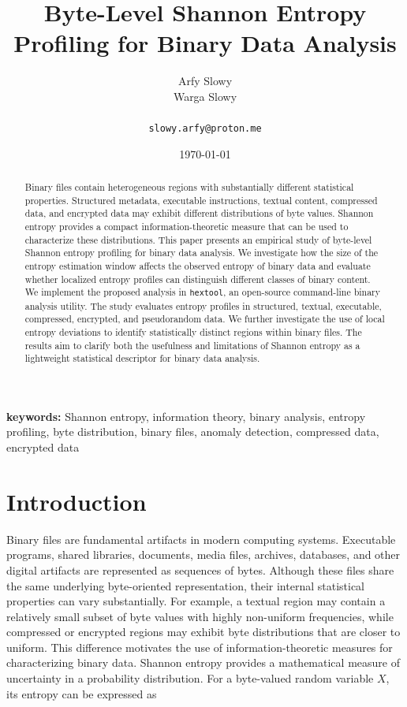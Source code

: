 \documentclass[10pt,letterpaper]{article}
\title{Byte-Level Shannon Entropy Profiling for Binary Data Analysis}
\author{
    Arfy Slowy\\
    Warga Slowy\\
    \\
    \texttt{slowy.arfy@proton.me}
}
\date{\today}
\begin{document}
\maketitle

\begin{abstract} Binary files contain heterogeneous regions with substantially different statistical properties. Structured metadata, executable instructions, textual content, compressed data, and encrypted data may exhibit different distributions of byte values. Shannon entropy provides a compact information-theoretic measure that can be used to characterize these distributions. This paper presents an empirical study of byte-level Shannon entropy profiling for binary data analysis. We investigate how the size of the entropy estimation window affects the observed entropy of binary data and evaluate whether localized entropy profiles can distinguish different classes of binary content. We implement the proposed analysis in \texttt{hextool}, an open-source command-line binary analysis utility. The study evaluates entropy profiles in structured, textual, executable, compressed, encrypted, and pseudorandom data. We further investigate the use of local entropy deviations to identify statistically distinct regions within binary files. The results aim to clarify both the usefulness and limitations of Shannon entropy as a lightweight statistical descriptor for binary data analysis. \end{abstract}


\noindent
\textbf{keywords:}
Shannon entropy, information theory, binary analysis, entropy profiling, byte distribution, binary files, anomaly detection, compressed data, encrypted data


\section{Introduction}

Binary files are fundamental artifacts in modern computing systems. Executable programs, shared libraries, documents, media files, archives, databases, and other digital artifacts are represented as sequences of bytes. Although these files share the same underlying byte-oriented representation, their internal statistical properties can vary substantially. For example, a textual region may contain a relatively small subset of byte values with highly non-uniform frequencies, while compressed or encrypted regions may exhibit byte distributions that are closer to uniform. This difference motivates the use of information-theoretic measures for characterizing binary data. Shannon entropy provides a mathematical measure of uncertainty in a probability distribution. For a byte-valued random variable $X$, its entropy can be expressed as
\end{document}

